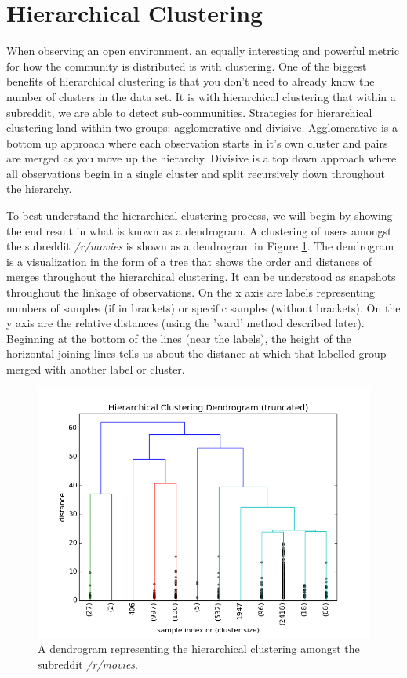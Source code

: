 \documentclass[msc,oneside]{ubcthesis}%
\begin{document}
\section{Hierarchical Clustering}
When observing an open environment, an equally interesting and powerful metric for how the community is distributed is with clustering. One of the biggest benefits of hierarchical clustering is that you don't need to already know the number of clusters in the data set. It is with hierarchical clustering that within a subreddit, we are able to detect sub-communities. Strategies for hierarchical clustering land within two groups: agglomerative and divisive. Agglomerative is a bottom up approach where each observation starts in it's own cluster and pairs are merged as you move up the hierarchy. Divisive is a top down approach where all observations begin in a single cluster and split recursively down throughout the hierarchy. 
\par
To best understand the hierarchical clustering process, we will begin by showing the end result in what is known as a dendrogram. A clustering of users amongst the subreddit \textit{/r/movies} is shown as a dendrogram in Figure \ref{fig:moviesdend}. The dendrogram is a visualization in the form of a tree that shows the order and distances of merges throughout the hierarchical clustering. It can be understood as snapshots throughout the linkage of observations. On the x axis are labels representing numbers of samples (if in brackets) or specific samples (without brackets). On the y axis are the relative distances (using the 'ward' method described later). Beginning at the bottom of the lines (near the labels), the height of the horizontal joining lines tells us about the distance at which that labelled group merged with another label or cluster. 

\begin{figure}[H]
\includegraphics[width=\textwidth]{movies_dendogram.png}
\caption[Dendrogram of /r/movies]{
A dendrogram representing the hierarchical clustering amongst the subreddit \textit{/r/movies}.}
\label{fig:moviesdend}
\end{figure}
\end{document}
